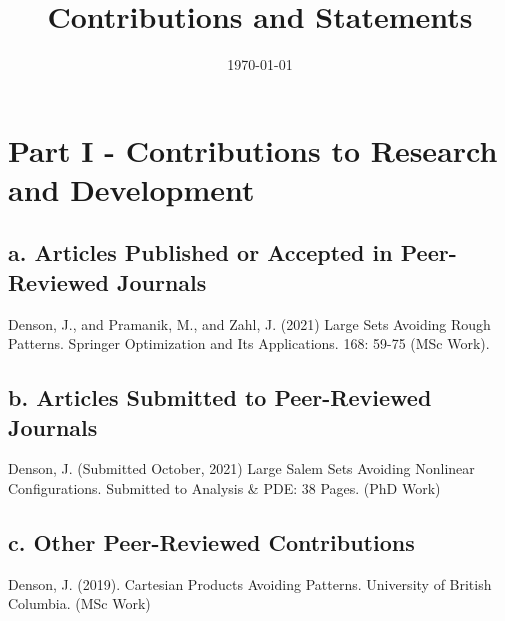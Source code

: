 \documentclass[12pt]{article}
\title{Contributions and Statements}
\author{}
\date{\today}
\theoremstyle{plain}
\theoremstyle{remark}
\theoremstyle{definition}
\begin{document}
\maketitle

\section*{Part I - Contributions to Research and Development}

\subsection*{a. Articles Published or Accepted in Peer-Reviewed Journals}

\begin{thebibliography}{9}

Denson, J., and Pramanik, M., and Zahl, J. (2021) Large Sets Avoiding Rough Patterns. Springer Optimization and Its Applications. 168: 59-75 (MSc Work).

\end{thebibliography}

\subsection*{b. Articles Submitted to Peer-Reviewed Journals}

\begin{thebibliography}{9}

\makeatletter
\addtocounter{\@listctr}{1}
\makeatother

Denson, J. (Submitted October, 2021) Large Salem Sets Avoiding Nonlinear Configurations. Submitted to Analysis \& PDE: 38 Pages. (PhD Work)

\end{thebibliography}

\subsection*{c. Other Peer-Reviewed Contributions}

\begin{thebibliography}{9}

\makeatletter
\addtocounter{\@listctr}{2}
\makeatother

Denson, J. (2019). Cartesian Products Avoiding Patterns. University of British Columbia. (MSc Work)

\end{thebibliography}
\end{document}

